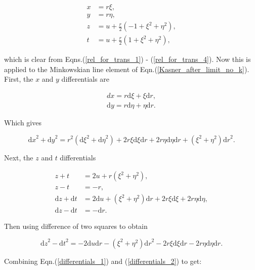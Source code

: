\begin{align}
x & = r \xi, \nonumber \\
y & = r \eta, \nonumber \\
z & = u + \frac{r}{2} (-1 + \xi^2 + \eta^2), \nonumber \\
t & = u + \frac{r}{2} (1 + \xi^2 + \eta^2),  \label{trans_x_to_xi} 
\end{align} 

\noindent which is clear from Eqns.(\ref{rel_for_trans_1}) - (\ref{rel_for_trans_4}). Now this is applied to the Minkowskian line element of Eqn.(\ref{Kasner_after_limit_no_k}). First, the $x$ and $y$ differentials are

\begin{eqnarray*} 
dx = r \mathrm{d}\xi + \xi \mathrm{d}r, \\
\mathrm{d}y = r \mathrm{d}\eta + \eta \mathrm{d}r. 
\end{eqnarray*} 

\noindent Which gives

\begin{equation}\label{differentials_1}
{\mathrm{d}x}^2 + {\mathrm{d}y}^2 = r^2 ({\mathrm{d}\xi}^2 + {\mathrm{d}\eta}^2) + 2 r \xi {\mathrm{d}\xi} {\mathrm{d}r} + 2 r \eta {\mathrm{d}\eta}{\mathrm{d}r} + (\xi^2 + \eta^2) {\mathrm{d}r}^2.
\end{equation}

\noindent Next, the $z$ and $t$ differentials

\begin{align*}
z + t & = 2 u + r (\xi^2 + \eta^2), \\
z - t & = - r, \\
{\mathrm{d}z} + {\mathrm{d}t} & = 2 \mathrm{d}u + (\xi^2 + \eta^2) \mathrm{d}r + 2 r \xi {\mathrm{d}\xi} + 2 r \eta {\mathrm{d}\eta}, \\
{\mathrm{d}z} - {\mathrm{d}t} & = - \mathrm{d}r. 
\end{align*}

\noindent Then using difference of two squares to obtain

\begin{equation}\label{differentials_2}
{\mathrm{d}z}^2 - {\mathrm{d}t}^2 = -2 {\mathrm{d}u}{\mathrm{d}r} - (\xi^2 + \eta^2) {\mathrm{d}r}^2 - 2 r \xi {\mathrm{d}\xi}{\mathrm{d}r} - 2 r \eta {\mathrm{d}\eta}{\mathrm{d}r}.
\end{equation}

\noindent Combining Eqn.(\ref{differentials_1}) and (\ref{differentials_2}) to get:

